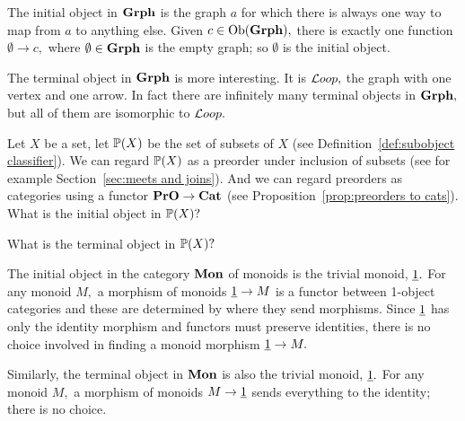 \documentclass[../main/CT4S-EN-RU]{subfiles}
\begin{document}
\begin{exampleRUS}\label{ex:universal obs in set}
\end{exampleRUS}

\begin{exampleENG}
The initial object in ${\mathbf{Grph}}$ is the graph $a$ for which there is always one way to map from $a$ to anything else. Given $c\in\operatorname{Ob}({\mathbf{Grph}}),$ there is exactly one function $\emptyset\to c,$ where $\emptyset\in{\mathbf{Grph}}$ is the empty graph; so $\emptyset$ is the initial object.

The terminal object in ${\mathbf{Grph}}$ is more interesting. It is ${\mathcal{L} oop},$ the graph with one vertex and one arrow. In fact there are infinitely many terminal objects in ${\mathbf{Grph}},$ but all of them are isomorphic to ${\mathcal{L} oop}.$ 
\end{exampleENG}

\begin{exampleRUS}
\end{exampleRUS}

\begin{exerciseENG}
Let $X$ be a set, let ${\mathbb P}(X)$ be the set of subsets of $X$ (see Definition~\ref{def:subobject classifier}). We can regard ${\mathbb P}(X)$ as a preorder under inclusion of subsets (see for example Section~\ref{sec:meets and joins}). And we can regard preorders as categories using a functor ${\mathbf{PrO}}\rightarrow{\mathbf{Cat}}$ (see Proposition~\ref{prop:preorders to cats}).
\sexc What is the initial object in ${\mathbb P}(X)?$
\item What is the terminal object in ${\mathbb P}(X)?$ 
\endsexc
\end{exerciseENG}

\begin{exerciseRUS}
\end{exerciseRUS}

\begin{exampleENG}\label{ex:initial monoid terminal monoid}
The initial object in the category ${\mathbf{Mon}}$ of monoids is the trivial monoid, $\underline{1}.$ For any monoid $M,$ a morphism of monoids $\underline{1}\rightarrow M$ is a functor between 1-object categories and these are determined by where they send morphisms. Since $\underline{1}$ has only the identity morphism and functors must preserve identities, there is no choice involved in finding a monoid morphism $\underline{1}\rightarrow M.$

Similarly, the terminal object in ${\mathbf{Mon}}$ is also the trivial monoid, $\underline{1}.$ For any monoid $M,$ a morphism of monoids $M\rightarrow\underline{1}$ sends everything to the identity; there is no choice.
\end{exampleENG}
\end{document}
